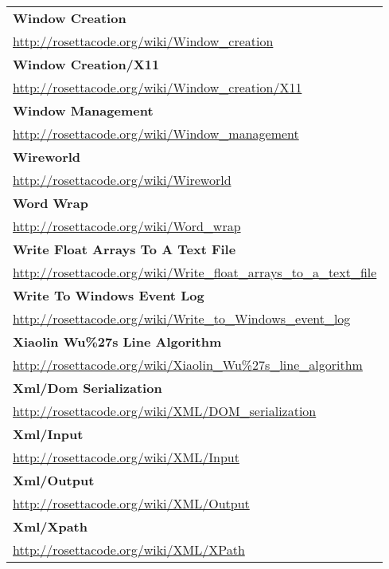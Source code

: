 \begin{longtable}{l}
\textbf{Window Creation } \\ \href{http://rosettacode.org/wiki/Window\_creation}{http://rosettacode.org/wiki/Window\_creation} \\
\textbf{Window Creation/X11 } \\ \href{http://rosettacode.org/wiki/Window\_creation/X11}{http://rosettacode.org/wiki/Window\_creation/X11} \\
\textbf{
Window Management } \\ \href{http://rosettacode.org/wiki/Window\_management}{http://rosettacode.org/wiki/Window\_management} \\
\textbf{Wireworld } \\ \href{http://rosettacode.org/wiki/Wireworld}{http://rosettacode.org/wiki/Wireworld} \\
\textbf{Word Wrap } \\ \href{http://rosettacode.org/wiki/Word\_wrap}{http://rosettacode.org/wiki/Word\_wrap} \\
\textbf{
Write Float Arrays To A Text File } \\ \href{http://rosettacode.org/wiki/Write\_float\_arrays\_to\_a\_text\_file}{http://rosettacode.org/wiki/Write\_float\_arrays\_to\_a\_text\_file} \\
\textbf{Write To Windows Event Log } \\ \href{http://rosettacode.org/wiki/Write\_to\_Windows\_event\_log}{http://rosettacode.org/wiki/Write\_to\_Windows\_event\_log} \\
\textbf{
Xiaolin Wu\%27s Line Algorithm } \\
\href{http://rosettacode.org/wiki/Xiaolin\_Wu\%27s\_line\_algorithm}{http://rosettacode.org/wiki/Xiaolin\_Wu\%27s\_line\_algorithm} \\
\textbf{Xml/Dom Serialization } \\ \href{http://rosettacode.org/wiki/XML/DOM\_serialization}{http://rosettacode.org/wiki/XML/DOM\_serialization} \\
\textbf{Xml/Input } \\ \href{http://rosettacode.org/wiki/XML/Input}{http://rosettacode.org/wiki/XML/Input} \\
\textbf{
Xml/Output } \\ \href{http://rosettacode.org/wiki/XML/Output}{http://rosettacode.org/wiki/XML/Output} \\
\textbf{Xml/Xpath } \\ \href{http://rosettacode.org/wiki/XML/XPath}{http://rosettacode.org/wiki/XML/XPath} \\

\end{longtable}
